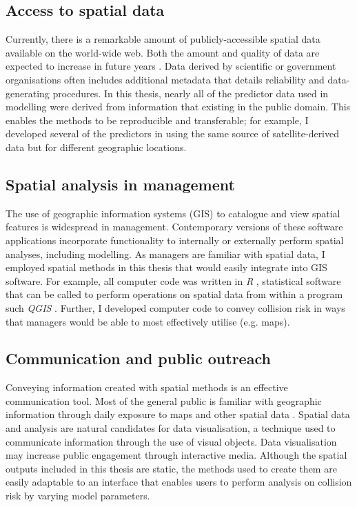 \subsection{Access to spatial data}

Currently, there is a remarkable amount of publicly-accessible spatial data available on the world-wide web. Both the amount and quality of data are expected to increase in future years \citep{}. Data derived by scientific or government organisations often includes additional metadata that details reliability and data-generating procedures. In this thesis, nearly all of the predictor data used in modelling were derived from information that existing in the public domain. This enables the methods to be reproducible and transferable; for example, I developed several of the predictors in  using the same source of satellite-derived data but for different geographic locations.

\subsection{Spatial analysis in management}

The use of geographic information systems (GIS) to catalogue and view spatial features is widespread in management. Contemporary versions of these software applications incorporate functionality to internally or externally perform spatial analyses, including modelling. As managers are familiar with spatial data, I employed spatial methods in this thesis that would easily integrate into GIS software. For example, all computer code was written in \textit{R} \citep{}, statistical software that can be called to perform operations on spatial data from within a program such \textit{QGIS} \citep{}. Further, I developed computer code to convey collision risk in ways that managers would be able to most effectively utilise (e.g. maps).

\subsection{Communication and public outreach}

Conveying information created with spatial methods is an effective communication tool. Most of the general public is familiar with geographic information through daily exposure to maps and other spatial data \citep{}. Spatial data and analysis are natural candidates for data visualisation, a technique used to communicate information through the use of visual objects. Data visualisation may increase public engagement through interactive media. Although the spatial outputs included in this thesis are static, the methods used to create them are easily adaptable to an interface that enables users to perform analysis on collision risk by varying model parameters.

